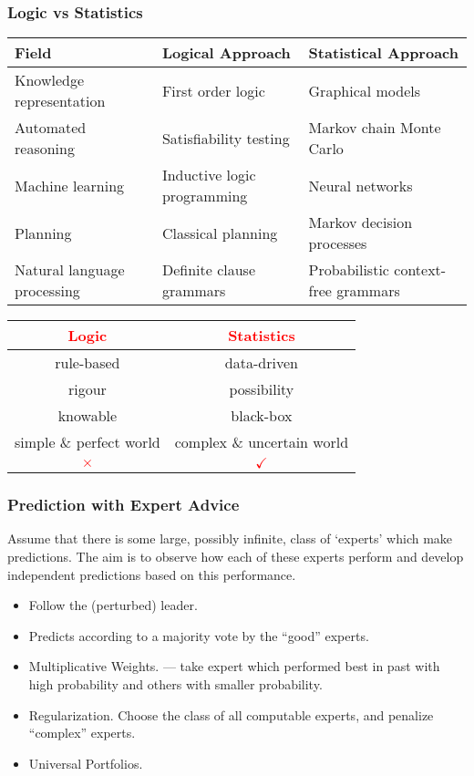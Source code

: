 \documentclass[UTF8,11pt,colorlinks,compress,openany]{beamer}%
\begin{document}
\begin{frame}\frametitle{Logic vs Statistics}%
\begin{table}\centering
\begin{tabu}{p{.29\textwidth}|p{.29\textwidth}|p{.3\textwidth}}
\hline
\textbf{Field} & \textbf{Logical Approach} & \textbf{Statistical Approach}\\
\hline
Knowledge representation & First order logic & Graphical models\\
\hline
Automated reasoning & Satisfiability testing & Markov chain Monte Carlo\\
\hline
Machine learning & Inductive logic programming & Neural networks\\
\hline
Planning & Classical planning & Markov decision processes\\
\hline
Natural language processing & Definite clause grammars & Probabilistic context-free grammars\\
\hline
\end{tabu}
\end{table}
	\begin{table}
		\centering
		\begin{tabu}{c|c}
			\hline
			\large\textcolor{red}{Logic} &\large\textcolor{red}{Statistics}\\
			\hline
			rule-based &data-driven\\
			\hline
			rigour &possibility\\
			\hline
			knowable &black-box\\
			\hline
			simple \& perfect world &complex \& uncertain world\\
			\hline
			\Large\textcolor{red}{$\times$} &\Large\textcolor{red}{$\checkmark$}\\
			\hline
		\end{tabu}%
	\end{table}
\end{frame}

\begin{frame}\frametitle{Prediction with Expert Advice}
	Assume that there is some large, possibly infinite, class of `experts' which make predictions. The aim is to observe how each of these experts perform and develop independent predictions based on this performance.
	\begin{itemize}
		\item Follow the (perturbed) leader.
		\item Predicts according to a majority vote by the ``good'' experts.
		\item Multiplicative Weights. --- take expert which performed best in past with high probability and others with smaller probability.
		\item Regularization. Choose the class of all computable experts, and penalize ``complex'' experts.
		\item Universal Portfolios.
	\end{itemize}
\end{frame}
\end{document}
